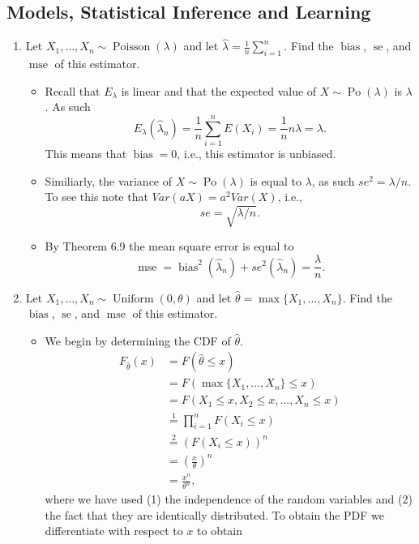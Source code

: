 \documentclass{article}
\newcommand{\mse}{\operatorname{mse}}
\newcommand{\bias}{\operatorname{bias}}
\newcommand{\se}{\operatorname{se}}
\begin{document}
\subsection{Models, Statistical Inference and Learning}
\begin{enumerate}
\item Let $X_1, \dots, X_n \sim \operatorname{Poisson}(\lambda)$ and let $\hat{\lambda} = \frac{1}{n} \sum_{i = 1}^n$. Find the $\bias$, $\se$, and $\mse$ of this estimator.
	\begin{itemize}
		\item Recall that $E_\lambda$ is linear and that the expected value of $X \sim \operatorname{Po}(\lambda)$ is $\lambda$. As such
		$$
		E_\lambda(\hat{\lambda}_n) = \frac{1}{n} \sum_{i = 1}^n E(X_i) = \frac{1}{n} n \lambda = \lambda.
		$$
		This means that $\bias = 0$, i.e., this estimator is unbiased.
		\item Similiarly, the variance of $X \sim \operatorname{Po}(\lambda)$ is equal to $\lambda$, as such $se^2 = \lambda / n$. To see this note that $Var(aX) = a^2Var(X)$, i.e.,
		$$
		se = \sqrt{\lambda / n}.
		$$
		\item By Theorem 6.9 the mean square error is equal to
		$$
		\mse = \bias^2(\hat{\lambda}_n) + se^2(\hat{\lambda}_n) = \frac{\lambda}{n}.
		$$
	\end{itemize}
\item Let $X_1, \dots, X_n \sim \operatorname{Uniform}(0, \theta)$ and let $\hat{\theta} = \max\{X_1, \dots, X_n\}$. Find the $\bias$, $\se$, and $\mse$ of this estimator.
	\begin{itemize}
		\item We begin by determining the CDF of $\hat{\theta}$.
		$$
		\begin{aligned}
		F_{\hat{\theta}}(x) &= F(\hat{\theta} \leq x) \\ 
		&= F(\max\{X_1, \dots, X_n\} \leq x) \\
		&= F(X_1 \leq x, X_2 \leq x, \dots, X_n \leq x) \\
		&\overset{1}{=} \prod_{i = 1}^n F(X_i \leq x) \\
		&\overset{2}{=} (F(X_i \leq x))^n \\
		&= \left( \frac{x}{\theta} \right)^n \\
		&= \frac{x^n}{\theta^n},
		\end{aligned}
		$$
		where we have used (1) the independence of the random variables and (2) the fact that they are identically distributed. To obtain the PDF we differentiate with respect to $x$ to obtain

\end{itemize}
\end{enumerate}
\end{document}
